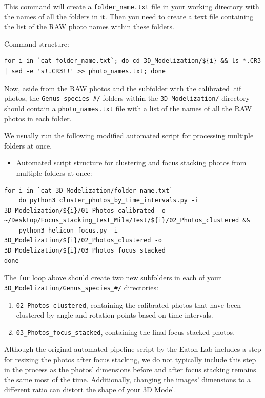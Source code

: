 \documentclass[
]{book}
\providecommand{\tightlist}{%
  \setlength{\itemsep}{0pt}\setlength{\parskip}{0pt}}
\begin{document}
This command will create a \texttt{folder\_name.txt} file in your working directory with the names of
all the folders in it. Then you need to create a text file containing the list of
the RAW photo names within these folders.

Command structure:

\begin{verbatim}
for i in `cat folder_name.txt`; do cd 3D_Modelization/${i} && ls *.CR3 | sed -e 's!.CR3!!' >> photo_names.txt; done
\end{verbatim}

Now, aside from the RAW photos and the subfolder with the calibrated .tif photos,
the \texttt{Genus\_species\_\#/} folders within the \texttt{3D\_Modelization/} directory should contain
a \texttt{photo\_names.txt} file with a list of the names of all the RAW photos in each folder.

We usually run the following modified automated script for processing multiple folders at once.

\begin{itemize}
\tightlist
\item
  Automated script structure for clustering and focus stacking photos from multiple folders at once:
\end{itemize}

\begin{verbatim}
for i in `cat 3D_Modelization/folder_name.txt`
    do python3 cluster_photos_by_time_intervals.py -i 3D_Modelization/${i}/01_Photos_calibrated -o ~/Desktop/Focus_stacking_test_Mila/Test/${i}/02_Photos_clustered &&
    python3 helicon_focus.py -i 3D_Modelization/${i}/02_Photos_clustered -o 3D_Modelization/${i}/03_Photos_focus_stacked
done
\end{verbatim}

The \texttt{for} loop above should create two new subfolders in each of
your \texttt{3D\_Modelization/Genus\_species\_\#/} directories:

\begin{enumerate}
\def\labelenumi{\arabic{enumi}.}
\item
  \texttt{02\_Photos\_clustered}, containing the calibrated photos that have been clustered
  by angle and rotation points based on time intervals.
\item
  \texttt{03\_Photos\_focus\_stacked}, containing the final focus stacked photos.
\end{enumerate}

Although the original automated pipeline script by the Eaton Lab includes a step
for resizing the photos after focus stacking, we do not typically include this step
in the process as the photos' dimensions before and after focus stacking remains the same
most of the time. Additionally, changing the images' dimensions to a different ratio
can distort the shape of your 3D Model.
\end{document}
